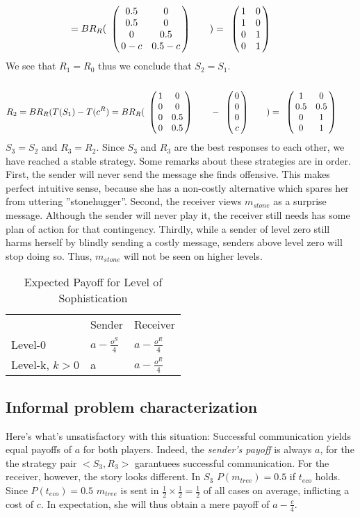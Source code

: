 \documentclass[10]{article}
\begin{document}
\begin{equation*}
=
BR_R(
\bordermatrix{
            &  & \cr
    & 0.5 & 0 \cr
     & 0.5 & 0 \cr
     & 0 & 0.5 \cr
     & 0-c & 0.5-c \cr
 }\qquad)
=
\bordermatrix{
            &  & \cr
    & 1 & 0 \cr
     & 1 & 0 \cr
     & 0 & 1 \cr
     & 0 & 1 \cr
 }\qquad
\end{equation*}
We see that $R_1=R_0$ thus we conclude that $S_2=S_1$.
\begin{equation*}
R_2=BR_R(T(S_1)-T(c^R)=
BR_R(
\bordermatrix{
            &  & \cr
    & 1 & 0 \cr
     & 0 & 0 \cr
     & 0 & 0.5 \cr
     & 0 & 0.5 \cr
 }\qquad
-
\bordermatrix{
  & \cr
    & 0 \cr
     & 0 \cr
     & 0 \cr
     & c \cr
 }\qquad
)
=
\bordermatrix{
            &  & \cr
    & 1 & 0 \cr
     & 0.5 & 0.5 \cr
     & 0 & 1 \cr
     & 0 & 1 \cr
 }\qquad
\end{equation*}
$S_3=S_2$ and $R_3=R_2$. Since $S_3$ and $R_3$ are the best responses to each other, we have reached a stable strategy. 
Some remarks about these strategies are in order. First, the sender will never send the message she finds offensive. This makes perfect intuitive sense, because she has a non-costly alternative which spares her from uttering ''stonehugger''. Second, the receiver views $m_{stone}$ as a surprise message. Although the sender will never play it, the receiver still needs has some plan of action for that contingency. Thirdly, while a sender of level zero still harms herself by blindly sending a costly message, senders above level zero will stop doing so. Thus, $m_{stone}$ will not be seen on higher levels. 

\begin{table}[h]
\centering
\caption{Expected Payoff for Level of Sophistication}
\label{my-label}
\begin{tabular}{lll}
                                    & Sender                                  & Receiver                                \\ \cline{2-3}
\multicolumn{1}{l|}{Level-0}        & \multicolumn{1}{l|}{$a-\tfrac{o^S}{4}$} & \multicolumn{1}{l|}{$a-\tfrac{o^R}{4}$} \\ \cline{2-3}
\multicolumn{1}{l|}{Level-k, $k>0$} & \multicolumn{1}{l|}{a}                  & \multicolumn{1}{l|}{$a-\tfrac{o^R}{4}$} \\ \cline{2-3}
\end{tabular}
\end{table}

\subsection{Informal problem characterization}
Here's what's unsatisfactory with this situation: Successful communication yields equal payoffs of $a$ for both players. Indeed, the \textit{sender's payoff} is always $a$, for the the strategy pair $<S_3,R_3>$ garantuees successful communication. For the receiver, however, the story looks different. In $S_3$ $P(m_{tree})=0.5$ if $t_{eco}$ holds. Since $P(t_{eco})=0.5$ $m_{tree}$ is sent in $\tfrac{1}{2}\times \tfrac{1}{2} = \tfrac{1}{2}$ of all cases on average, inflicting a cost of $c$. In expectation, she will thus obtain a mere payoff of $a-\tfrac{c}{4}$.
\end{document}
